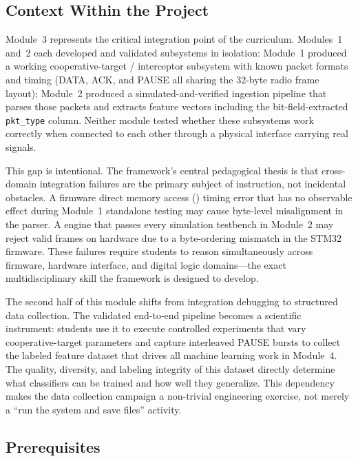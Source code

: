 \documentclass[11pt,letterpaper]{article}
\begin{document}
	\subsection{Context Within the Project}

	Module~3 represents the critical integration point of the curriculum. Modules~1 and~2 each developed and validated subsystems in isolation: Module~1 produced a working cooperative-target / interceptor \RF{} subsystem with known packet formats and timing (DATA, ACK, and PAUSE all sharing the 32-byte radio frame layout); Module~2 produced a simulated-and-verified \FPGA{} ingestion pipeline that parses those packets and extracts feature vectors including the bit-field-extracted \texttt{pkt\_type} column. Neither module tested whether these subsystems work correctly when connected to each other through a physical interface carrying real signals.

	This gap is intentional. The framework's central pedagogical thesis is that cross-domain integration failures are the primary subject of instruction, not incidental obstacles. A firmware direct memory access (\DMA{}) timing error that has no observable effect during Module~1 standalone testing may cause byte-level misalignment in the \FPGA{} parser. A \CRC{} engine that passes every simulation testbench in Module~2 may reject valid frames on hardware due to a byte-ordering mismatch in the STM32 firmware. These failures require students to reason simultaneously across firmware, hardware interface, and digital logic domains---the exact multidisciplinary skill the framework is designed to develop.

	The second half of this module shifts from integration debugging to structured data collection. The validated end-to-end pipeline becomes a scientific instrument: students use it to execute controlled experiments that vary cooperative-target parameters and capture interleaved PAUSE bursts to collect the labeled \RF{} feature dataset that drives all machine learning work in Module~4. The quality, diversity, and labeling integrity of this dataset directly determine what classifiers can be trained and how well they generalize. This dependency makes the data collection campaign a non-trivial engineering exercise, not merely a ``run the system and save files'' activity.

	\subsection{Prerequisites}
\end{document}
